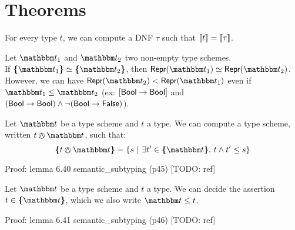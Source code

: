 \documentclass[a4paper]{article}
\theoremstyle{definition}
\begin{document}
    \section{Theorems}

    \begin{property}
      For every type $t$, we can compute a DNF $\tau$ such that ${\llbracket t \rrbracket} = {\llbracket \tau \rrbracket}$.
    \end{property}

    \begin{property}
      Let $\ts_1$ and $\ts_2$ two non-empty type schemes.\\
      If $\tsint {\ts_1} \simeq \tsint {\ts_2}$, then $\tsrep {\ts_1} \simeq \tsrep {\ts_2}$.\\
      However, we can have $\tsrep {\ts_2} < \tsrep {\ts_1}$ even if $\ts_1 \leq \ts_2$ (ex: ${[}\text{\textsf{Bool}}\to \text{\textsf{Bool}}]$ and $(\text{\textsf{Bool}}\to \text{\textsf{Bool}}) \land \neg (\text{\textsf{Bool}}\to \text{\textsf{False}})$).
    \end{property}

    \begin{lemma}
      Let $\ts$ be a type scheme and $t$ a type. We can compute a type scheme, written $t \tsand \ts$, such that:
      \[\tsint {t \tsand \ts} = \{s \alt \exists t' \in \tsint \ts.\ t \land t' \leq s \}\]
    \end{lemma}
    Proof: lemma 6.40 semantic\_subtyping (p45) [TODO: ref]


    \begin{lemma}
      Let $\ts$ be a type scheme and $t$ a type. We can decide the assertion $t \in \tsint \ts$,
      which we also write $\ts \leq t$.
    \end{lemma}
    Proof: lemma 6.41 semantic\_subtyping (p46) [TODO: ref]


\end{document}
